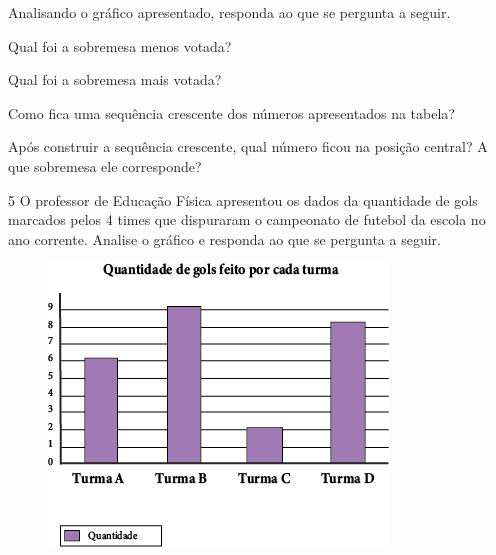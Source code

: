Analisando o gráfico apresentado, responda ao que se pergunta a seguir.

\begin{escolha}
\item
  Qual foi a sobremesa menos votada?
\item{}

\item
  Qual foi a sobremesa mais votada?
\item{}

\item
  Como fica uma sequência crescente dos números apresentados na tabela?
\item{}

\item
  Após construir a sequência crescente, qual número ficou na posição
  central? A que sobremesa ele corresponde?

\item {}
\end{escolha}

\num{5} O professor de Educação Física apresentou os dados da quantidade de gols
marcados pelos 4 times que dispuraram o campeonato de futebol da escola no ano
corrente. Analise o gráfico e responda ao que se pergunta a seguir.

\begin{figure}[htpb!]
\centering
\includegraphics[width=.85\textwidth]{media/image44.png}
\end{figure}

